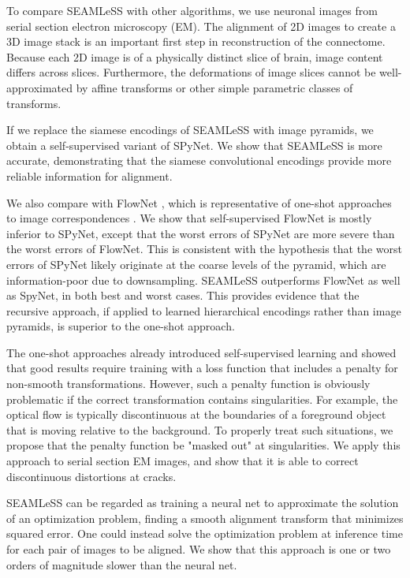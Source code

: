 \documentclass{article}
\begin{document}
To compare SEAMLeSS with other algorithms, we use neuronal images from serial section electron microscopy (EM). The alignment of 2D images to create a 3D image stack is an important first step in reconstruction of the connectome. Because each 2D image is of a physically distinct slice of brain, image content differs across slices. Furthermore, the deformations of image slices cannot be well-approximated by affine transforms or other simple parametric classes of transforms.

If we replace the siamese encodings of SEAMLeSS with image pyramids, we obtain a self-supervised variant of SPyNet. We show that SEAMLeSS is more accurate, demonstrating that the siamese convolutional encodings provide more reliable information for alignment.

We also compare with FlowNet \citep{flownet}, which is representative of one-shot approaches to image correspondences \citep{balakrishnan2018unsupervised, yoo2017ssemnet}.  We show that self-supervised FlowNet is mostly inferior to SPyNet, except that the worst errors of SPyNet are more severe than the worst errors of FlowNet. This is consistent with the hypothesis that the worst errors of SPyNet likely originate at the coarse levels of the pyramid, which are information-poor due to downsampling. SEAMLeSS outperforms FlowNet as well as SpyNet, in both best and worst cases. This provides evidence that the recursive approach, if applied to learned hierarchical encodings rather than image pyramids, is superior to the one-shot approach.

The one-shot approaches \citep{yoo2017ssemnet, balakrishnan2018unsupervised} already introduced self-supervised learning and showed that good results require training with a loss function that includes a penalty for non-smooth transformations. However, such a penalty function is obviously problematic if the correct transformation contains singularities. For example, the optical flow is typically discontinuous at the boundaries of a foreground object that is moving relative to the background. To properly treat such situations, we propose that the penalty function be "masked out" at singularities. We apply this approach to serial section EM images, and show that it is able to correct discontinuous distortions at cracks. 

SEAMLeSS can be regarded as training a neural net to approximate the solution of an optimization problem, finding a smooth alignment transform that minimizes squared error. One could instead solve the optimization problem at inference time for each pair of images to be aligned. We show that this approach is one or two orders of magnitude slower than the neural net.
\end{document}
